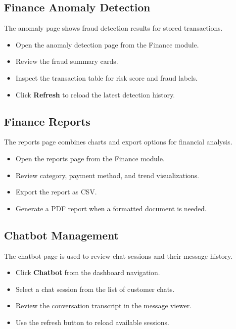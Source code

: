 \subsection{Finance Anomaly Detection}
The anomaly page shows fraud detection results for stored transactions.
\begin{itemize}
    \item Open the anomaly detection page from the Finance module.
    \item Review the fraud summary cards.
    \item Inspect the transaction table for risk score and fraud labels.
    \item Click \textbf{Refresh} to reload the latest detection history.
\end{itemize}

\subsection{Finance Reports}
The reports page combines charts and export options for financial analysis.
\begin{itemize}
    \item Open the reports page from the Finance module.
    \item Review category, payment method, and trend visualizations.
    \item Export the report as CSV.
    \item Generate a PDF report when a formatted document is needed.
\end{itemize}

\subsection{Chatbot Management}
The chatbot page is used to review chat sessions and their message history.
\begin{itemize}
    \item Click \textbf{Chatbot} from the dashboard navigation.
    \item Select a chat session from the list of customer chats.
    \item Review the conversation transcript in the message viewer.
    \item Use the refresh button to reload available sessions.
\end{itemize}

